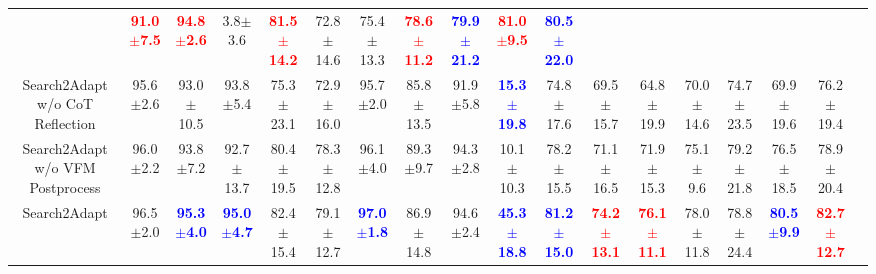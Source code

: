 \begin{table}[htbp]
{\begin{tabular}{@{}cccccccccccccccccc@{}}
  & {\textcolor{red}{\textbf{91.0$\pm$7.5}}}
  & {\textcolor{red}{\textbf{94.8$\pm$2.6}}}
  & {3.8$\pm$3.6}
  & {\textcolor{red}{\textbf{81.5$\pm$14.2}}}
  & {72.8$\pm$14.6}
  & {75.4$\pm$13.3}
  & {\textcolor{red}{\textbf{78.6$\pm$11.2}}}
  & {\textcolor{blue}{\textbf{79.9$\pm$21.2}}}
  & {\textcolor{red}{\textbf{81.0$\pm$9.5}}}
  & {\textcolor{blue}{\textbf{80.5$\pm$22.0}}}\\
  {Search2Adapt w/o CoT Reflection}
  & {95.6$\pm$2.6}
  & {93.0$\pm$10.5}
  & {93.8$\pm$5.4}
  & {75.3$\pm$23.1}
  & {72.9$\pm$16.0}
  & {95.7$\pm$2.0}
  & {85.8$\pm$13.5}
  & {91.9$\pm$5.8}
  & \textcolor{blue}{\textbf{15.3$\pm$19.8}}
  & {74.8$\pm$17.6}
  & {69.5$\pm$15.7}
  & {64.8$\pm$19.9}
  & {70.0$\pm$14.6}
  & {74.7$\pm$23.5}
  & {69.9$\pm$19.6}
  & {76.2$\pm$19.4}\\
{Search2Adapt w/o VFM Postprocess}
  & {96.0$\pm$2.2}
  & {93.8$\pm$7.2}
  & {92.7$\pm$13.7}
  & {80.4$\pm$19.5}
  & {78.3$\pm$12.8}
  & {96.1$\pm$4.0}
  & {89.3$\pm$9.7}
  & {94.3$\pm$2.8}
  & {10.1$\pm$10.3}
  & {78.2$\pm$15.5}
  & {71.1$\pm$16.5}
  & {71.9$\pm$15.3}
  & {75.1$\pm$9.6}
  & {79.2$\pm$21.8}
  & {76.5$\pm$18.5}
  & {78.9$\pm$20.4}\\  \hline
{Search2Adapt}
  & {96.5$\pm$2.0}
  & {\textcolor{blue}{\textbf{95.3$\pm$4.0}}}
  & {\textcolor{blue}{\textbf{95.0$\pm$4.7}}}
  & {82.4$\pm$15.4}
  & {79.1$\pm$12.7}
  & {\textcolor{blue}{\textbf{97.0$\pm$1.8}}}
  & {86.9$\pm$14.8}
  & {94.6$\pm$2.4}
  & {\textcolor{blue}{\textbf{45.3$\pm$18.8}}}
  & {\textcolor{blue}{\textbf{81.2$\pm$15.0}}}
  & {\textcolor{red}{\textbf{74.2$\pm$13.1}}}
  & {\textcolor{red}{\textbf{76.1$\pm$11.1}}}
  & {78.0$\pm$11.8}
  & {78.8$\pm$24.4}
  & {\textcolor{blue}{\textbf{80.5$\pm$9.9}}}
  & {\textcolor{red}{\textbf{82.7$\pm$12.7}}}\\
\bottomrule
\end{tabular}%
}


\end{table}
